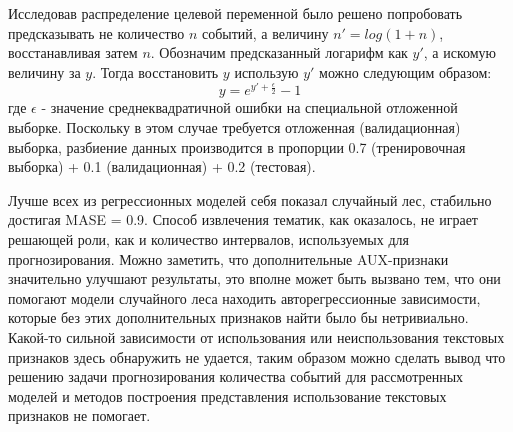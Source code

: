 Исследовав распределение целевой переменной было решено попробовать предсказывать не количество $n$ событий, а величину $n' = log(1+n)$, восстанавливая затем $n$. Обозначим предсказанный логарифм как $y'$, а искомую величину за $y$. Тогда восстановить $y$ использую $y'$ можно следующим образом:
$$ y = e^{y' + \frac{\epsilon}{2}} - 1 $$
где $\epsilon$ - значение среднеквадратичной ошибки на специальной отложенной выборке.
Поскольку в этом случае требуется отложенная (валидационная) выборка, разбиение данных производится в пропорции 0.7 (тренировочная выборка) + 0.1 (валидационная) + 0.2 (тестовая). 

Лучше всех из регрессионных моделей себя показал случайный лес, стабильно достигая MASE = 0.9. Способ извлечения тематик, как оказалось, не играет решающей роли, как и количество интервалов, используемых для прогнозирования. Можно заметить, что дополнительные AUX-признаки значительно улучшают результаты, это вполне может быть вызвано тем, что они помогают модели случайного леса находить авторегрессионные зависимости, которые без этих дополнительных признаков найти было бы нетривиально. 
Какой-то сильной зависимости от использования или неиспользования текстовых признаков здесь обнаружить не удается, таким образом можно сделать вывод что решению задачи прогнозирования количества событий для рассмотренных моделей и методов построения представления использование текстовых признаков не помогает.
